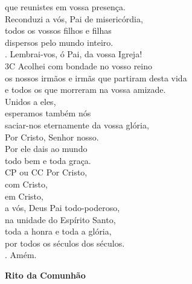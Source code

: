 \documentclass{book}
\begin{document}
\begin{flushleft}
    que reunistes em vossa presença. \\
    Reconduzi a vós, Pai de misericórdia, \\
    todos os vossos filhos e filhas \\
    dispersos pelo mundo inteiro.
    \vspace{.2cm} \\
    {\color{VioletRed2} \Rbar.} Lembrai-vos, ó Pai, da vossa Igreja!
    \vspace{.2cm} \\
    {\color{VioletRed2}3C} Acolhei com bondade no vosso reino \\
    os nossos irmãos e irmãs que partiram desta vida \\
    e todos os que morreram na vossa amizade. \\
    Unidos a eles, \\
    esperamos também nós \\
    saciar-nos eternamente da vossa glória, \\
    Por Cristo, Senhor nosso. \\
    Por ele dais ao mundo \\
    todo bem e toda graça.
    \vspace{.2cm} \\
    {\color{VioletRed2}CP ou CC} Por Cristo, \\
    com Cristo, \\
    em Cristo, \\
    a vós, Deus Pai todo-poderoso, \\
    na unidade do Espírito Santo, \\
    toda a honra e toda a glória, \\
    por todos os séculos dos séculos.
    \vspace{.2cm} \\
    {\color{VioletRed2} \Rbar.} Amém.

\end{flushleft}
\begin{center}
    \textbf{Rito da Comunhão}
\end{center}
\end{document}
